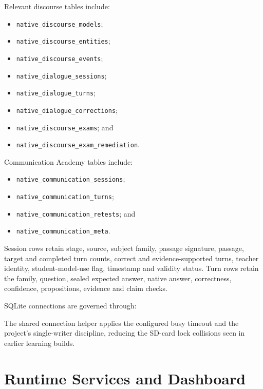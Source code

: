 \documentclass[11pt,a4paper]{article}
\begin{document}
Relevant discourse tables include:

\begin{itemize}
  \item \texttt{native\_discourse\_models};
  \item \texttt{native\_discourse\_entities};
  \item \texttt{native\_discourse\_events};
  \item \texttt{native\_dialogue\_sessions};
  \item \texttt{native\_dialogue\_turns};
  \item \texttt{native\_dialogue\_corrections};
  \item \texttt{native\_discourse\_exams}; and
  \item \texttt{native\_discourse\_exam\_remediation}.
\end{itemize}

Communication Academy tables include:

\begin{itemize}
  \item \texttt{native\_communication\_sessions};
  \item \texttt{native\_communication\_turns};
  \item \texttt{native\_communication\_retests}; and
  \item \texttt{native\_communication\_meta}.
\end{itemize}

Session rows retain stage, source, subject family, passage signature, passage, target and completed
turn counts, correct and evidence-supported turns, teacher identity, student-model-use flag,
timestamp and validity status.  Turn rows retain the family, question, sealed expected answer,
native answer, correctness, confidence, propositions, evidence and claim checks.

SQLite connections are governed through:

\begin{center}
\end{center}

The shared connection helper applies the configured busy timeout and the project's single-writer
discipline, reducing the SD-card lock collisions seen in earlier learning builds.

\section{Runtime Services and Dashboard}
\end{document}
